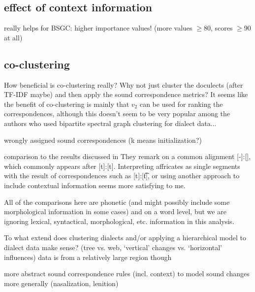 \documentclass[a4paper]{article}
\begin{document}
\subsection{effect of context information}

really helps for BSGC: higher importance values! (more values $\geq$80, scores $\geq$90 at all)

\subsection{co-clustering}
How beneficial is co-clustering really? Why not just cluster the doculects (after TF-IDF maybe) and then apply the sound correspondence metrics? It seems like the benefit of co-clustering is mainly that $v_2$ can be used for ranking the correspondences, although this doesn't seem to be very popular among the authors who used bipartite spectral graph clustering for dialect data...

wrongly assigned sound correspondences (k means initialization?)

comparison to the results discussed in \citet{wieling2011bipartite}
They remark on a common alignment [-]:[\textesh], which commonly appears after [t]:[t]. Interpreting affricates as single segments with the result of correspondences such as [t]:[\t{t\textesh}], or using another approach to include contextual information seems more satisfying to me.


All of the comparisons here are phonetic (and might possibly include some morphological information in some cases) and on a word level, but we are ignoring lexical, syntactical, morphological, etc. information in this analysis.

To what extend does clustering dialects and/or applying a hierarchical model to dialect data make sense? (tree vs. web, `vertical' changes vs. `horizontal' influences)
data is from a relatively large region though

more abstract sound correspondence rules (incl. context) to model sound changes more generally (nasalization, lenition)



\end{document}
